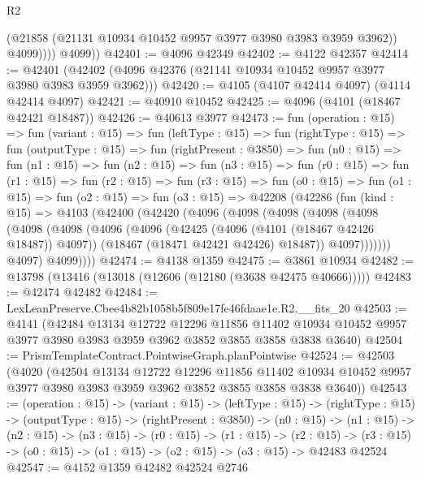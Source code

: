 \begin{lexlean}{R2}
\begin{coremodule}
                (@21858 (@21131 @10934 @10452 @9957 @3977 @3980 @3983 @3959 @3962))
                @4099))))
        @4099))
@42401 := @4096 @42349
@42402 := @4122 @42357
@42414 := @42401 (@42402 (@4096 @42376 (@21141 @10934 @10452 @9957 @3977 @3980 @3983 @3959 @3962)))
@42420 := @4105 (@4107 @42414 @4097) (@4114 @42414 @4097)
@42421 := @40910 @10452
@42425 := @4096 (@4101 (@18467 @42421 @18487))
@42426 := @40613 @3977
@42473 := fun (operation : @15) =>
  fun (variant : @15) =>
  fun (leftType : @15) =>
  fun (rightType : @15) =>
  fun (outputType : @15) =>
  fun (rightPresent : @3850) =>
  fun (n0 : @15) =>
  fun (n1 : @15) =>
  fun (n2 : @15) =>
  fun (n3 : @15) =>
  fun (r0 : @15) =>
  fun (r1 : @15) =>
  fun (r2 : @15) =>
  fun (r3 : @15) =>
  fun (o0 : @15) =>
  fun (o1 : @15) =>
  fun (o2 : @15) =>
  fun (o3 : @15) =>
  @42208
    (@42286
      (fun (kind : @15) =>
      @4103
        (@42400
          (@42420
            (@4096
              (@4098
                (@4098
                  (@4098
                    (@4098
                      (@4098
                        (@4098
                          (@4096
                            (@4096
                              (@42425 (@4096 (@4101 (@18467 @42426 @18487)) @4097))
                              (@18467 (@18471 @42421 @42426) @18487))
                            @4097)))))))
              @4097)
            @4099))))
@42474 := @4138 @1359
@42475 := @3861 @10934
@42482 := @13798 (@13416 (@13018 (@12606 (@12180 (@3638 @42475 @40666)))))
@42483 := @42474 @42482
@42484 := LexLeanPreserve.Cbee4b82b1058b5f809e17fe46fdaae1e.R2.__fits_20
@42503 := @4141
    (@42484
      @13134
      @12722
      @12296
      @11856
      @11402
      @10934
      @10452
      @9957
      @3977
      @3980
      @3983
      @3959
      @3962
      @3852
      @3855
      @3858
      @3838
      @3640)
@42504 := PrismTemplateContract.PointwiseGraph.planPointwise
@42524 := @42503
    (@4020
      (@42504
        @13134
        @12722
        @12296
        @11856
        @11402
        @10934
        @10452
        @9957
        @3977
        @3980
        @3983
        @3959
        @3962
        @3852
        @3855
        @3858
        @3838
        @3640))
@42543 := (operation : @15) ->
  (variant : @15) ->
  (leftType : @15) ->
  (rightType : @15) ->
  (outputType : @15) ->
  (rightPresent : @3850) ->
  (n0 : @15) ->
  (n1 : @15) ->
  (n2 : @15) ->
  (n3 : @15) ->
  (r0 : @15) ->
  (r1 : @15) ->
  (r2 : @15) -> (r3 : @15) -> (o0 : @15) -> (o1 : @15) -> (o2 : @15) -> (o3 : @15) -> @42483 @42524
@42547 := @4152 @1359 @42482 @42524 @2746

\end{coremodule}
\end{lexlean}
